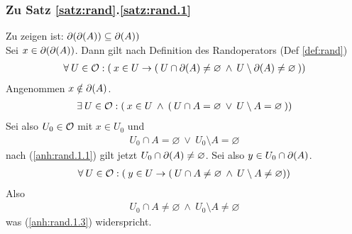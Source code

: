 \subsubsection{Zu Satz \ref{satz:rand}.\ref{satz:rand.1}} \label{anh:rand.1}
    Zu zeigen ist: $\partial(\partial(A)) \subseteq \partial(A))$ \\
    Sei $x \in \partial(\partial(A))$. Dann gilt nach Definition des Randoperators (Def \ref{def:rand})
    \begin{align} \label{anh:rand.1.1}
        \forall\: U \in \mathcal{O}: (\: x \in U \to (\: U \cap \partial(A) \neq \varnothing \:\land\: U \setminus \partial(A) \neq \varnothing \:))
    \end{align}
    Angenommen $x \notin \partial(A)$. %
    \begin{align*} %
        \exists\: U \in \offen : (\: x \in U \:\land\: (\: U \cap A = \varnothing \:\lor\: U \setminus A = \varnothing \:))
    \end{align*}
    Sei also $U_0 \in \mathcal{O}$ mit $x \in U_0$ und
    \begin{align} \label{anh:rand.1.3}
        U_0 \cap A = \varnothing \:\lor\: U_0 \setminus A = \varnothing
    \end{align}
    nach (\ref{anh:rand.1.1}) gilt jetzt $U_0 \cap \partial(A) \neq \varnothing$. Sei also $y \in U_0 \cap \partial(A)$.
    \begin{align*} %
        \forall\: U \in \offen: (\: y \in U \to (\: U \cap A \neq \varnothing \:\land\: U \setminus A \neq \varnothing))
    \end{align*}
    Also
    \begin{align*}
        U_0 \cap A \neq \varnothing \:\land\: U_0 \setminus A \neq \varnothing
    \end{align*}
    was (\ref{anh:rand.1.3}) widerspricht.

	
